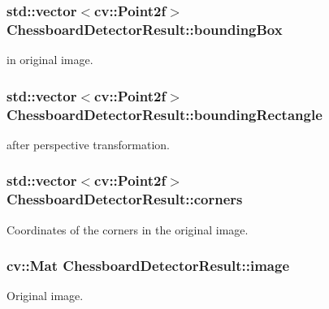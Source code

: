 \subsubsection[{\texorpdfstring{bounding\+Box}{boundingBox}}]{\setlength{\rightskip}{0pt plus 5cm}std\+::vector$<$cv\+::\+Point2f$>$ Chessboard\+Detector\+Result\+::bounding\+Box}\hypertarget{struct_chessboard_detector_result_a6887aab98e7283ccfa4a51f8714d5260}{}\label{struct_chessboard_detector_result_a6887aab98e7283ccfa4a51f8714d5260}
in original image. 
\subsubsection[{\texorpdfstring{bounding\+Rectangle}{boundingRectangle}}]{\setlength{\rightskip}{0pt plus 5cm}std\+::vector$<$cv\+::\+Point2f$>$ Chessboard\+Detector\+Result\+::bounding\+Rectangle}\hypertarget{struct_chessboard_detector_result_a1c1c71bb678c2eb872d9f8c4ae0a9871}{}\label{struct_chessboard_detector_result_a1c1c71bb678c2eb872d9f8c4ae0a9871}
after perspective transformation. 
\subsubsection[{\texorpdfstring{corners}{corners}}]{\setlength{\rightskip}{0pt plus 5cm}std\+::vector$<$cv\+::\+Point2f$>$ Chessboard\+Detector\+Result\+::corners}\hypertarget{struct_chessboard_detector_result_a69a0fd183e694c1fb80bbad1ed2d6833}{}\label{struct_chessboard_detector_result_a69a0fd183e694c1fb80bbad1ed2d6833}
Coordinates of the corners in the original image. 
\subsubsection[{\texorpdfstring{image}{image}}]{\setlength{\rightskip}{0pt plus 5cm}cv\+::\+Mat Chessboard\+Detector\+Result\+::image}\hypertarget{struct_chessboard_detector_result_a9cb87f19e643fa012305b5575720332a}{}\label{struct_chessboard_detector_result_a9cb87f19e643fa012305b5575720332a}
Original image. 
